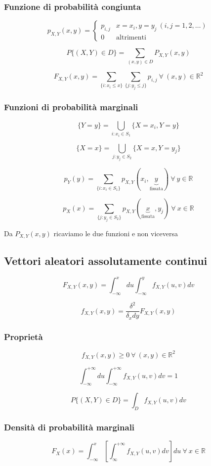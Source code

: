 \subsubsection*{Funzione di probabilità congiunta}

$$p_{X,Y}(x, y) =
\begin{cases}
    p_{i,j} & x = x_i, y = y_j \ (i, j = 1,2,\dots)\\
    0 & \text{altrimenti}
\end{cases}$$

$$
P\{(X,Y) \in D\} = \sum_{(x,y) \in D}P_{X,Y}(x,y)
$$

$$
F_{X,Y}(x,y) = \sum_{\{i : x_i \le x\}} \sum_{\{j : y_j \le j\}} p_{i,j} 
\ \forall \ (x, y) \in \mathbb{R}^2
$$

\subsubsection*{Funzioni di probabilità marginali}
$$
\{Y=y\} = \bigcup_{i : x_i \in S_1}\{X=x_i, Y=y\}
$$

$$
\{X=x\} = \bigcup_{j : y_j \in S_2}\{X=x, Y=y_j\}
$$

$$
p_Y(y) = \sum_{\{i: x_i \in S_1\}}p_{X,Y}(x_i, \underbrace{y}_{\text{fissata}}) \ \forall \ y \in \mathbb{R}
$$

$$
p_X(x) = \sum_{\{j: y_j \in S_2\}}p_{X,Y}(\underbrace{x}_{\text{fissata}}, y_j) \ \forall \ x \in \mathbb{R}
$$

Da $P_{X,Y}(x,y)$ ricaviamo le due funzioni e non viceversa

\subsection*{Vettori aleatori assolutamente continui}
$$
F_{X,Y}(x,y) = \int_{-\infty}^{x}du \int_{-\infty}^{y} f_{X,Y}(u,v) dv
$$

$$
f_{X,Y}(x,y) = \frac{\delta^2}{\delta_x dy} F_{X,Y}(x,y)
$$

\subsubsection*{Proprietà}
$$
f_{X,Y}(x,y) \ge 0 \ \forall \ (x,y) \in \mathbb{R}^2
$$

$$
\int_{-\infty}^{+\infty}du \int_{-\infty}^{+\infty} f_{X,Y}(u,v) dv = 1
$$

$$
P\{(X,Y) \in D\} = \int_{D} f_{X,Y}(u,v) dv
$$

\subsubsection*{Densità di probabilità marginali}
$$
F_X(x) = \int_{-\infty}^{x}\left[\int_{\infty}^{+\infty} f_{X,Y}(u,v) dv\right] du \ \forall \ x \in \mathbb{R}
$$

